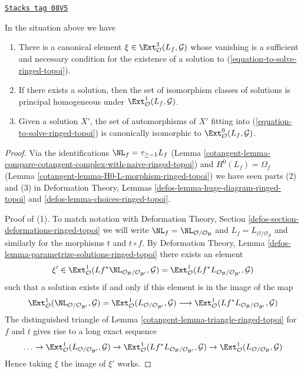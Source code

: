 \begin{lemma}
\label{cotangent-lemma-find-obstruction-ringed-topoi}
\href{https://stacks.math.columbia.edu/tag/08V5}{\texttt{Stacks tag 08V5}}

In the situation above we have
\begin{enumerate}
\item There is a canonical element
$\xi \in \Ext^2_\mathcal{O}(L_f, \mathcal{G})$
whose vanishing is a sufficient and necessary condition for the existence
of a solution to (\ref{equation-to-solve-ringed-topoi}).
\item If there exists a solution, then the set of
isomorphism classes of solutions is principal homogeneous under
$\Ext^1_\mathcal{O}(L_f, \mathcal{G})$.
\item Given a solution $X'$, the set of automorphisms of $X'$
fitting into (\ref{equation-to-solve-ringed-topoi}) is canonically isomorphic
to $\Ext^0_\mathcal{O}(L_f, \mathcal{G})$.
\end{enumerate}
\end{lemma}

\begin{proof}

Via the identifications $\NL_f = \tau_{\geq -1}L_f$
(Lemma \ref{cotangent-lemma-compare-cotangent-complex-with-naive-ringed-topoi}) and
$H^0(L_f) = \Omega_f$
(Lemma \ref{cotangent-lemma-H0-L-morphism-ringed-topoi})
we have seen parts (2) and (3) in
Deformation Theory, Lemmas \ref{defos-lemma-huge-diagram-ringed-topoi} and
\ref{defos-lemma-choices-ringed-topoi}.

\medskip\noindent
Proof of (1). To match notation with Deformation Theory, Section
\ref{defos-section-deformations-ringed-topoi} we will write
$\NL_f = \NL_{\mathcal{O}/\mathcal{O}_\mathcal{B}}$ and
$L_f = L_{\mathcal{O}/\mathcal{O}_\mathcal{B}}$ and similarly
for the morphisms $t$ and $t \circ f$. By
Deformation Theory, Lemma \ref{defos-lemma-parametrize-solutions-ringed-topoi}
there exists an element
$$
\xi' \in
\Ext^1_\mathcal{O}(
Lf^*\NL_{\mathcal{O}_\mathcal{B}/\mathcal{O}_{\mathcal{B}'}}, \mathcal{G}) =
\Ext^1_\mathcal{O}(
Lf^*L_{\mathcal{O}_\mathcal{B}/\mathcal{O}_{\mathcal{B}'}}, \mathcal{G})
$$
such that a solution exists if and only if this element is in
the image of the map
$$
\Ext^1_\mathcal{O}(
\NL_{\mathcal{O}/\mathcal{O}_{\mathcal{B}'}}, \mathcal{G}) =
\Ext^1_\mathcal{O}(
L_{\mathcal{O}/\mathcal{O}_{\mathcal{B}'}}, \mathcal{G})
\longrightarrow
\Ext^1_\mathcal{O}(
Lf^*L_{\mathcal{O}_\mathcal{B}/\mathcal{O}_{\mathcal{B}'}}, \mathcal{G})
$$
The distinguished triangle of Lemma \ref{cotangent-lemma-triangle-ringed-topoi}
for $f$ and $t$ gives rise to a long exact sequence
$$
\ldots \to
\Ext^1_\mathcal{O}(
L_{\mathcal{O}/\mathcal{O}_{\mathcal{B}'}}, \mathcal{G}) \to
\Ext^1_\mathcal{O}(
Lf^*L_{\mathcal{O}_\mathcal{B}/\mathcal{O}_{\mathcal{B}'}}, \mathcal{G})
\to
\Ext^1_\mathcal{O}(
L_{\mathcal{O}/\mathcal{O}_\mathcal{B}}, \mathcal{G})
$$
Hence taking $\xi$ the image of $\xi'$ works.
\end{proof}

